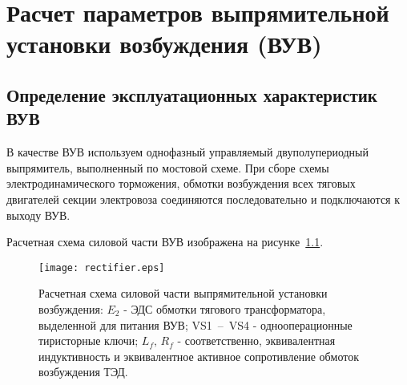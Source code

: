 \chapter{Расчет параметров выпрямительной установки возбуждения (ВУВ)}
\section{Определение эксплуатационных характеристик ВУВ}

В качестве ВУВ используем однофазный управляемый двуполупериодный выпрямитель, выполненный по мостовой схеме. При сборе схемы электродинамического торможения, обмотки возбуждения всех тяговых двигателей секции электровоза соединяются последовательно и подключаются к выходу ВУВ. 

Расчетная схема силовой части ВУВ изображена на рисунке~\ref{fig:vuv}.

\begin{figure}[H]
    \centering    
    \texttt{[image: rectifier.eps]}
    \caption{Расчетная схема силовой части выпрямительной установки возбуждения: $E_2$ - ЭДС обмотки тягового трансформатора, выделенной для питания ВУВ; VS1~--~VS4 - однооперационные тиристорные ключи; $L_f, \, R_f$ - соответственно, эквивалентная индуктивность и эквивалентное активное сопротивление обмоток возбуждения ТЭД.}
    \label{fig:vuv}
\end{figure}
